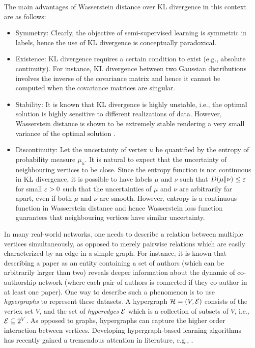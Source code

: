 \documentclass[letterpaper]{article} %
\begin{document}
The main advantages of Wasserstein distance over KL divergence in this context are as follows: 
\begin{itemize}
	\item Symmetry: Clearly, the objective of semi-supervised learning is symmetric in labels, hence the use of KL divergence is conceptually paradoxical. 
	\item Existence: KL divergence requires a certain condition to exist (e.g., absolute continuity). For instance, KL divergence  between two Gaussian distributions involves the inverse of the covariance matrix and hence it cannot be computed when the covariance matrices are singular.
	\item Stability: It is known that KL divergence is highly unstable, i.e., the optimal solution is highly sensitive to different realizations of data. However, Wasserstein distance is shown to be extremely stable rendering a very small variance of the optimal solution \cite{KLvsWass}. 
	\item Discontinuity: 	Let the uncertainty of vertex $u$ be quantified by the entropy of probability measure $\mu_u$. It is natural to expect that the uncertainty of neighbouring vertices to be close. Since the entropy function is not continuous in KL divergence, it is possible to have labels $\mu$ and $\nu$ such that $D(\mu\|\nu)\leq \varepsilon$ for small $\varepsilon>0$ such that the uncertainties of $\mu$ and $\nu$ are arbitrarily far apart, even if both $\mu$ and $\nu$ are smooth. However, entropy is a continuous function in Wasserstein distance \cite{Yury_Wasserstein} and hence Wasserstein loss function guarantees that neighbouring vertices  have similar uncertainty.
\end{itemize}

In many real-world networks, one needs to describe a relation between multiple vertices simultaneously, as opposed to merely pairwise relations which are easily characterized by an edge in a simple graph. For instance, it is known that describing a paper as an entity containing a set of authors (which can be arbitrarily larger than two) reveals deeper information about the dynamic of co-authorship network (where each pair of authors is connected if they co-author in at least one paper). One way to describe such a phenomenon is to use \emph{hypergraphs} to represent these datasets. A hypergraph ${\mathcal H}=(V, \mathcal{E})$ consists of the vertex set $V$, and the set of \textit{hyperedges} $\mathcal{E}$ which is a collection of subsets of $V$, i.e., $\mathcal{E}\subseteq 2^V$.  As opposed to graphs, hypergraphs can capture the higher order interaction between vertices. Developing hypergraph-based learning algorithms has recently gained a tremendous attention in literature, e.g., \cite{Hypergraph_Clustering, Hypergraph_Jost, Hypergraph_Game, Hypergraph_Kannan, Hypergraph_Olgica, Hypergraph_TV, HypergraphScalable}.
\end{document}
